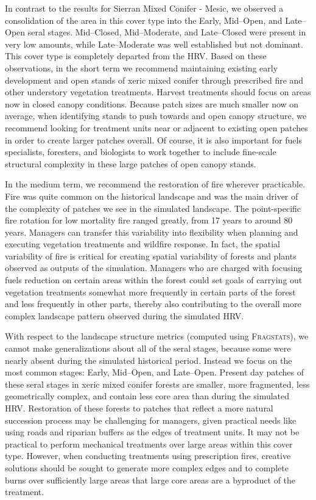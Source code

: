 In contrast to the results for Sierran Mixed Conifer - Mesic, we observed a consolidation of the area in this cover type into the Early, Mid--Open, and Late--Open seral stages. Mid--Closed, Mid--Moderate, and Late--Closed were present in very low amounts, while Late--Moderate was well established but not dominant. This cover type is completely departed from the HRV. Based on these observations, in the short term we recommend maintaining existing early development and open stands of xeric mixed conifer through prescribed fire and other understory vegetation treatments. Harvest treatments should focus on areas now in closed canopy conditions. Because patch sizes are much smaller now on average, when identifying stands to push towards and open canopy structure, we recommend looking for treatment units near or adjacent to existing open patches in order to create larger patches overall. Of course, it is also important for fuels specialists, foresters, and biologists to work together to include fine-scale structural complexity in these large patches of open canopy stands.

In the medium term, we recommend the restoration of fire wherever practicable. Fire was quite common on the historical landscape and was the main driver of the complexity of patches we see in the simulated landscape. The point-specific fire rotation for low mortality fire ranged greatly, from 17 years to around 80 years. Managers can transfer this variability into flexibility when planning and executing vegetation treatments and wildfire response. In fact, the spatial variability of fire is critical for creating spatial variability of forests and plants observed as outputs of the simulation. Managers who are charged with focusing fuels reduction on certain areas within the forest could set goals of carrying out vegetation treatments somewhat more frequently in certain parts of the forest and less frequently in other parts, thereby also contributing to the overall more complex landscape pattern observed during the simulated HRV. 

With respect to the landscape structure metrics (computed using \textsc{Fragstats}), we cannot make generalizations about all of the seral stages, because some were nearly absent during the simulated historical period. Instead we focus on the most common stages: Early, Mid--Open, and Late--Open. Present day patches of these seral stages in xeric mixed conifer forests are smaller, more fragmented, less geometrically complex, and contain less core area than during the simulated HRV. Restoration of these forests to patches that reflect a more natural succession process may be challenging for managers, given practical needs like using roads and riparian buffers as the edges of treatment units. It may not be practical to perform mechanical treatments over large areas within this cover type. However, when conducting treatments using prescription fires, creative solutions should be sought to generate more complex edges and to complete burns over sufficiently large areas that large core areas are a byproduct of the treatment.










